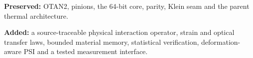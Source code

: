 \documentclass[10pt,a4paper]{article}
\numberwithin{equation}{section}
\begin{document}
\normalsize
\vfill
\begin{keybox}
\textbf{Preserved:} OTAN2, pinions, the 64-bit core, parity, Klein seam and the parent thermal architecture.\par
\textbf{Added:} a source-traceable physical interaction operator, strain and optical transfer laws, bounded material memory, statistical verification, deformation-aware PSI and a tested measurement interface.
\end{keybox}
\end{document}
